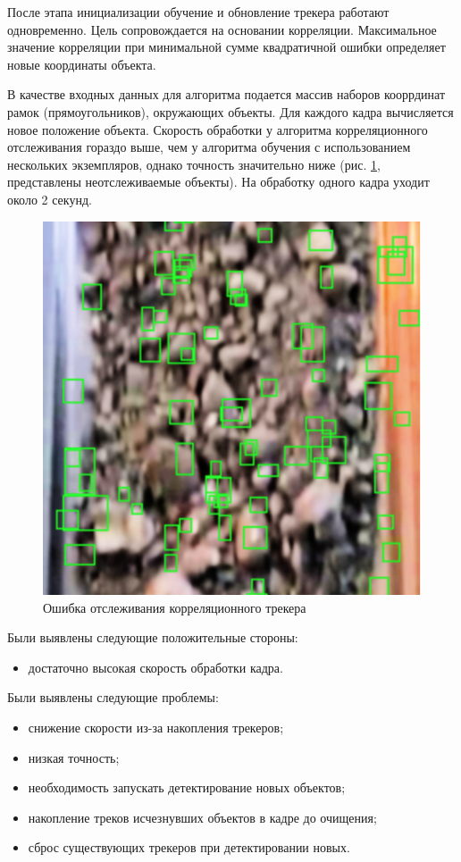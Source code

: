 \documentclass[times]{itmo-student-thesis}
\begin{document}
 После этапа инициализации обучение и обновление трекера работают одновременно. Цель сопровождается на основании корреляции. Максимальное значение корреляции  при минимальной сумме квадратичной ошибки определяет новые координаты объекта. 
 
 В качестве входных данных для алгоритма подается массив наборов кооррдинат рамок (прямоугольников), окружающих объекты. Для каждого кадра вычисляется новое положение объекта. 
Скорость обработки у алгоритма корреляционного отслеживания гораздо выше, чем у алгоритма обучения с использованием нескольких экземпляров,  однако точность значительно ниже (рис. \ref{fig:correrr}, представлены неотслеживаемые объекты). На обработку одного кадра уходит около 2 секунд. 

\begin{figure}
	\centering
	\includegraphics[width=0.5\linewidth]{images/corr_err}
	\caption{Ошибка отслеживания корреляционного трекера}
	\label{fig:correrr}
\end{figure}


Были выявлены следующие положительные стороны:
\begin{itemize}
	\item достаточно высокая скорость обработки кадра.
\end{itemize}
Были выявлены следующие проблемы:
\begin{itemize}
\item снижение скорости из-за накопления трекеров;
\item низкая точность;
\item необходимость запускать детектирование новых объектов;
\item накопление треков исчезнувших объектов в кадре до очищения;
\item  сброс существующих трекеров при детектировании новых.
\end{itemize}
\end{document}
